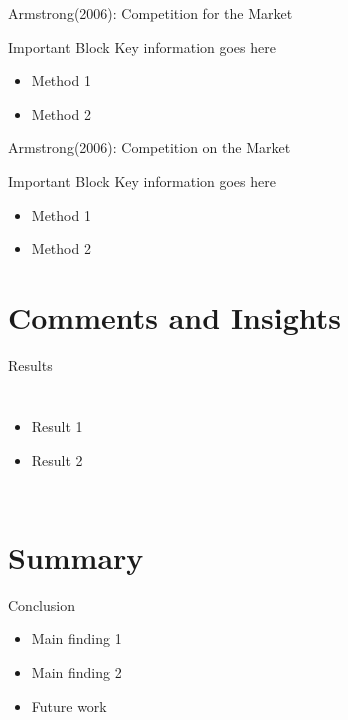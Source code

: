 \documentclass[aspectratio=169]{beamer}  %
\begin{document}
\begin{frame}{Armstrong(2006): Competition for the Market}
    \begin{block}{Important Block}
        Key information goes here
    \end{block}
    
    \begin{itemize}
        \item Method 1
        \item Method 2
    \end{itemize}
\end{frame}

\begin{frame}{Armstrong(2006): Competition on the Market}
    \begin{block}{Important Block}
        Key information goes here
    \end{block}
    
    \begin{itemize}
        \item Method 1
        \item Method 2
    \end{itemize}
\end{frame}

\section{Comments and Insights}
\begin{frame}{Results}
    \begin{columns}
        \begin{itemize}
            \item Result 1
            \item Result 2
        \end{itemize}
        
    \end{columns}
\end{frame}

\section{Summary}
\begin{frame}{Conclusion}
    \begin{itemize}
        \item Main finding 1
        \item Main finding 2
        \item Future work
    \end{itemize}
\end{frame}
\end{document}
